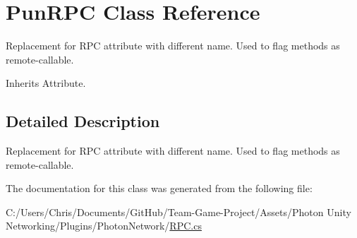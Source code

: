 \hypertarget{class_pun_r_p_c}{}\section{Pun\+R\+PC Class Reference}
\label{class_pun_r_p_c}


Replacement for R\+PC attribute with different name. Used to flag methods as remote-\/callable. 




Inherits Attribute.



\subsection{Detailed Description}
Replacement for R\+PC attribute with different name. Used to flag methods as remote-\/callable.



The documentation for this class was generated from the following file\+:\begin{DoxyCompactItemize}
\item 
C\+:/\+Users/\+Chris/\+Documents/\+Git\+Hub/\+Team-\/\+Game-\/\+Project/\+Assets/\+Photon Unity Networking/\+Plugins/\+Photon\+Network/\hyperlink{_r_p_c_8cs}{R\+P\+C.\+cs}\end{DoxyCompactItemize}
